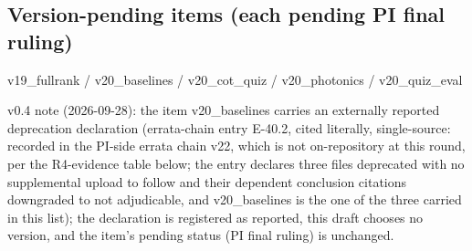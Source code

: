 \documentclass[11pt]{article}
\begin{document}
\subsection*{Version-pending items (each pending PI final ruling)}
\noindent v19\_fullrank / v20\_baselines / v20\_cot\_quiz / v20\_photonics / v20\_quiz\_eval\par
\noindent v0.4 note (2026-09-28): the item v20\_baselines carries an externally reported deprecation declaration (errata-chain entry E-40.2, cited literally, single-source: recorded in the PI-side errata chain v22, which is not on-repository at this round, per the R4-evidence table below; the entry declares three files deprecated with no supplemental upload to follow and their dependent conclusion citations downgraded to not adjudicable, and v20\_baselines is the one of the three carried in this list); the declaration is registered as reported, this draft chooses no version, and the item's pending status (PI final ruling) is unchanged.\par
\end{document}
